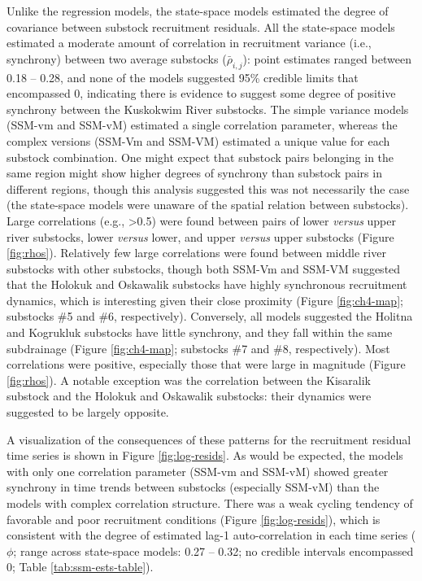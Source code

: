 \documentclass[12pt,]{book}
\theoremstyle{definition}
\theoremstyle{definition}
\theoremstyle{definition}
\theoremstyle{remark}
\begin{document}
Unlike the regression models, the state-space models estimated the
degree of covariance between substock recruitment residuals. All the
state-space models estimated a moderate amount of correlation in
recruitment variance (i.e., synchrony) between two average substocks
(\(\bar{\rho}_{i,j}\)): point estimates ranged between 0.18 -- 0.28, and
none of the models suggested 95\% credible limits that encompassed 0,
indicating there is evidence to suggest some degree of positive
synchrony between the Kuskokwim River substocks. The simple variance
models (SSM-vm and SSM-vM) estimated a single correlation parameter,
whereas the complex versions (SSM-Vm and SSM-VM) estimated a unique
value for each substock combination. One might expect that substock
pairs belonging in the same region might show higher degrees of
synchrony than substock pairs in different regions, though this analysis
suggested this was not necessarily the case (the state-space models were
unaware of the spatial relation between substocks). Large correlations
(e.g., \textgreater{}0.5) were found between pairs of lower
\emph{versus} upper river substocks, lower \emph{versus} lower, and
upper \emph{versus} upper substocks (Figure \ref{fig:rhos}). Relatively
few large correlations were found between middle river substocks with
other substocks, though both SSM-Vm and SSM-VM suggested that the
Holokuk and Oskawalik substocks have highly synchronous recruitment
dynamics, which is interesting given their close proximity (Figure
\ref{fig:ch4-map}; substocks \#5 and \#6, respectively). Conversely, all
models suggested the Holitna and Kogrukluk substocks have little
synchrony, and they fall within the same subdrainage (Figure
\ref{fig:ch4-map}; substocks \#7 and \#8, respectively). Most
correlations were positive, especially those that were large in
magnitude (Figure \ref{fig:rhos}). A notable exception was the
correlation between the Kisaralik substock and the Holokuk and Oskawalik
substocks: their dynamics were suggested to be largely opposite.

A visualization of the consequences of these patterns for the
recruitment residual time series is shown in Figure
\ref{fig:log-resids}. As would be expected, the models with only one
correlation parameter (SSM-vm and SSM-vM) showed greater synchrony in
time trends between substocks (especially SSM-vM) than the models with
complex correlation structure. There was a weak cycling tendency of
favorable and poor recruitment conditions (Figure \ref{fig:log-resids}),
which is consistent with the degree of estimated lag-1 auto-correlation
in each time series (\(\phi\); range across state-space models: 0.27 --
0.32; no credible intervals encompassed 0; Table
\ref{tab:ssm-ests-table}).
\end{document}
